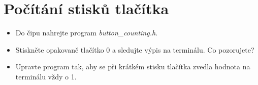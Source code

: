 \documentclass[12pt]{article}
\begin{document}
\section{Počítání stisků tlačítka} 

\begin{itemize} 
	\item Do čipu nahrejte program \textit{button\_counting.h}. 
	\item Stiskněte opakovaně tlačítko 0 a sledujte výpis na terminálu. Co pozorujete? 
	\item Upravte program tak, aby se při krátkém stisku tlačítka zvedla hodnota na terminálu vždy o 1.
\end{itemize} 
\end{document}
